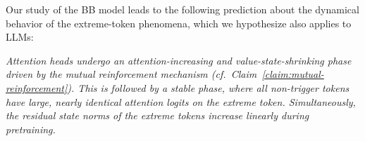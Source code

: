 \begin{figure}[h]
    \label{fig:olmo_predictions_phase1}
\end{figure}


Our study of the BB model leads to the following prediction about the dynamical behavior of the extreme-token phenomena, which we hypothesize also applies to LLMs:  
\begin{center}
    \textit{Attention heads undergo an attention-increasing and value-state-shrinking phase driven by the mutual reinforcement mechanism (cf.\ Claim~\ref{claim:mutual-reinforcement}). This is followed by a stable phase, where all non-trigger tokens have large, nearly identical attention logits on the extreme token. Simultaneously, the residual state norms of the extreme tokens increase linearly during pretraining.}
\end{center}



